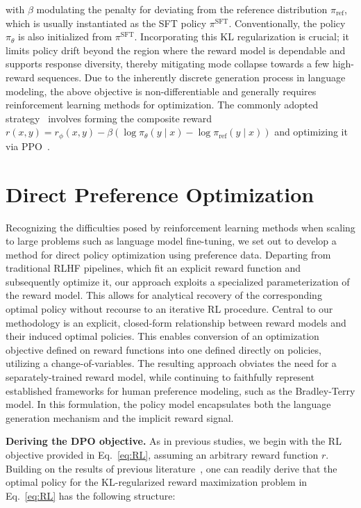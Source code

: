 with $\beta$ modulating the penalty for deviating from the reference distribution $\pi_\text{ref}$, which is usually instantiated as the SFT policy $\pi^\text{SFT}$. Conventionally, the policy $\pi_\theta$ is also initialized from $\pi^\text{SFT}$. Incorporating this KL regularization is crucial; it limits policy drift beyond the region where the reward model is dependable and supports response diversity, thereby mitigating mode collapse towards a few high-reward sequences. Due to the inherently discrete generation process in language modeling, the above objective is non-differentiable and generally requires reinforcement learning methods for optimization. The commonly adopted strategy~\citep{ziegler2020finetuning, stiennon2022learning, bai2022training, ouyang2022training} involves forming the composite reward $r(x, y) = r_{\phi}(x, y) - \beta (\log \pi_{\theta}(y\mid x) - \log \pi_\text{ref}(y\mid x))$ and optimizing it via PPO~\cite{schulman2017proximal}.

\section{Direct Preference Optimization}\label{sec:DPO}

Recognizing the difficulties posed by reinforcement learning methods when scaling to large problems such as language model fine-tuning, we set out to develop a method for direct policy optimization using preference data. Departing from traditional RLHF pipelines, which fit an explicit reward function and subsequently optimize it, our approach exploits a specialized parameterization of the reward model. This allows for analytical recovery of the corresponding optimal policy without recourse to an iterative RL procedure. Central to our methodology is an explicit, closed-form relationship between reward models and their induced optimal policies. This enables conversion of an optimization objective defined on reward functions into one defined directly on policies, utilizing a change-of-variables. The resulting approach obviates the need for a separately-trained reward model, while continuing to faithfully represent established frameworks for human preference modeling, such as the Bradley-Terry model. In this formulation, the policy model encapsulates both the language generation mechanism and the implicit reward signal.

\textbf{Deriving the DPO objective.} As in previous studies, we begin with the RL objective provided in Eq.~\ref{eq:RL}, assuming an arbitrary reward function $r$. Building on the results of previous literature~\citep{peters2007reinforcement, peng2019advantage, korbak2022reinforcement, go2023aligning}, one can readily derive that the optimal policy for the KL-regularized reward maximization problem in Eq.~\ref{eq:RL} has the following structure:

